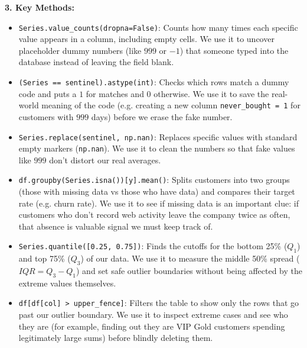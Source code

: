 \documentclass[11pt,a4paper]{article}
\begin{document}
\vspace{0.4em}
\noindent\textbf{3. Key Methods:}\par\vspace{0.2em}
\begin{itemize}[leftmargin=*]
    \item \lstinline!Series.value_counts(dropna=False)!: Counts how many times each specific value appears in a column, including empty cells. We use it to uncover placeholder dummy numbers (like $999$ or $-1$) that someone typed into the database instead of leaving the field blank.
    \item \lstinline!(Series == sentinel).astype(int)!: Checks which rows match a dummy code and puts a $1$ for matches and $0$ otherwise. We use it to save the real-world meaning of the code (e.g. creating a new column \lstinline!never_bought = 1! for customers with $999$ days) before we erase the fake number.
    \item \lstinline!Series.replace(sentinel, np.nan)!: Replaces specific values with standard empty markers (\lstinline!np.nan!). We use it to clean the numbers so that fake values like $999$ don't distort our real averages.
    \item \lstinline!df.groupby(Series.isna())[y].mean()!: Splits customers into two groups (those with missing data vs those who have data) and compares their target rate (e.g. churn rate). We use it to see if missing data is an important clue: if customers who don't record web activity leave the company twice as often, that absence is valuable signal we must keep track of.
    \item \lstinline!Series.quantile([0.25, 0.75])!: Finds the cutoffs for the bottom 25\% ($Q_1$) and top 75\% ($Q_3$) of our data. We use it to measure the middle 50\% spread ($IQR = Q_3 - Q_1$) and set safe outlier boundaries without being affected by the extreme values themselves.
    \item \lstinline!df[df[col] > upper_fence]!: Filters the table to show only the rows that go past our outlier boundary. We use it to inspect extreme cases and see who they are (for example, finding out they are VIP Gold customers spending legitimately large sums) before blindly deleting them.
\end{itemize}
\end{document}

